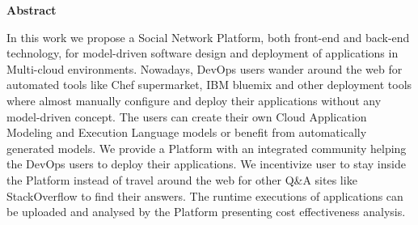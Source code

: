 \thispagestyle{empty}
\begin{titlepage}
\begin{center}
{\bf\Large Abstract}\\
\end{center}

\indent In this work we propose a Social Network Platform, both front-end and back-end technology, for model-driven software design and deployment of applications in Multi-cloud environments. Nowadays, DevOps users wander around the web for automated tools like Chef supermarket, IBM bluemix and other deployment tools where almost manually configure and deploy their applications without any model-driven concept. The users can create their own Cloud Application Modeling and Execution
Language models or benefit from automatically generated models. We provide a Platform with an integrated community helping the DevOps users to deploy their applications. We incentivize user to stay inside the Platform instead of travel around the web for other Q\&A sites like StackOverflow to find their answers. The runtime executions of applications can be uploaded and analysed by the Platform presenting cost effectiveness analysis.


\vfill
\end{titlepage}

